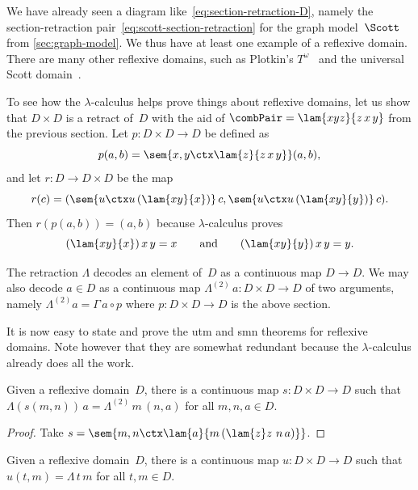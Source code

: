 We have already seen a diagram like~\eqref{eq:section-retraction-D}, namely the section-retraction pair~\eqref{eq:scott-section-retraction} for the graph model~$\Scott$ from \cref{sec:graph-model}. We thus have at least one example of a reflexive domain.
There are many other reflexive domains, such as Plotkin's $T^\omega$~ and the universal Scott domain~.


To see how the $\lambda$-calculus helps prove things about reflexive
domains, let us show that $D \times D$ is a retract of~$D$ with the aid of
$\combPair = \lam{x y z}{z\,x\,y}$ from the previous section. Let $p : D
\times D \to D$ be defined as
%
\begin{equation*}
  p (a, b) = \sem{x,y \ctx \lam{z}{z\,x\,y}}(a,b),
\end{equation*}
%
and let $r : D \to D \times D$ be the map
%
\begin{equation*}
  r(c) = (\sem{u \ctx u\,(\lam{x y}{x})} \, c,
          \sem{u \ctx u\,(\lam{x y}{y})} \, c).
\end{equation*}
%
Then $r (p (a, b)) = (a, b)$ because $\lambda$-calculus proves
%
\begin{equation*}
  (\lam{x y}{x})\, x \, y = x
  \qquad\text{and}\qquad
  (\lam{x y}{y})\, x \, y = y.
\end{equation*}

The retraction $\Lambda$ decodes an element of~$D$ as a continuous map $D \to D$. We may also decode $a \in D$ as a continuous map $\Lambda^{(2)}\, a : D \times D \to D$ of two arguments, namely $\Lambda^{(2)} a = \Gamma \, a \circ p$ where $p : D \times D \to D$ is the above section.

It is now easy to state and prove the utm and smn theorems for reflexive domains. Note however that they are somewhat redundant because the $\lambda$-calculus already does all the work.

\begin{theorem}
  Given a reflexive domain~$D$,
  there is a continuous map $s : D \times D \to D$ such that $\Lambda (s(m, n)) \, a = \Lambda^{(2)} \, m \, (n, a)$ for all $m, n, a \in D$.
\end{theorem}

\begin{proof}
  Take $s = \sem{m, n \ctx \lam{a}{m \,(\lam{z} z\,\,n\,a)}}$.
\end{proof}

\begin{theorem}
  Given a reflexive domain~$D$, there is a continuous map $u : D \times D \to D$ such that $u (t, m) = \Lambda\,t\,m$ for all $t, m \in D$.
\end{theorem}

